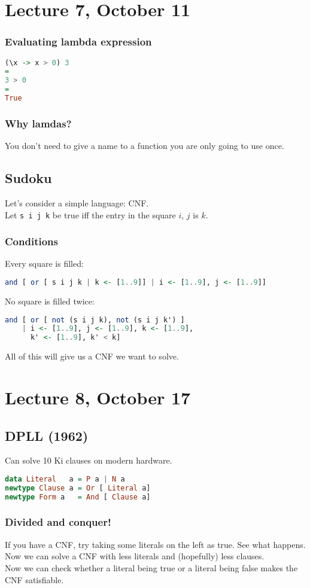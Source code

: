 \documentclass{article}
\theoremstyle{sltheorem}
\begin{document}
\section{Lecture 7, October 11}
\subsubsection{Evaluating lambda expression}
\begin{lstlisting}[language=haskell]
(\x -> x > 0) 3
=
3 > 0
=
True
\end{lstlisting}
\subsubsection{Why lamdas?}
You don't need to give a name to a function you are only going to use once.
\subsection{Sudoku}
Let's consider a simple language: CNF.\\
Let \texttt{s i j k} be true iff the entry in the square $i$, $j$ is $k$.
\subsubsection{Conditions}
Every square is filled:
\begin{lstlisting}[language=haskell]
and [ or [ s i j k | k <- [1..9]] | i <- [1..9], j <- [1..9]]
\end{lstlisting}
No square is filled twice:
\begin{lstlisting}[language=haskell]
and [ or [ not (s i j k), not (s i j k') ]
    | i <- [1..9], j <- [1..9], k <- [1..9],
      k' <- [1..9], k' < k]
\end{lstlisting}
All of this will give us a CNF we want to solve.
\section{Lecture 8, October 17}
\subsection{DPLL (1962)}
Can solve 10 Ki clauses on modern hardware.
\begin{lstlisting}[language=haskell]
data Literal   a = P a | N a
newtype Clause a = Or [ Literal a]
newtype Form a   = And [ Clause a]
\end{lstlisting}
\subsubsection{Divided and conquer!}
If you have a CNF, try taking some literals on the left as true. See what happens.
Now we can solve a CNF with less literals and (hopefully) less clauses.\\ 
Now we can check whether a literal being true or a literal being false makes the CNF satisfiable.
\end{document}
